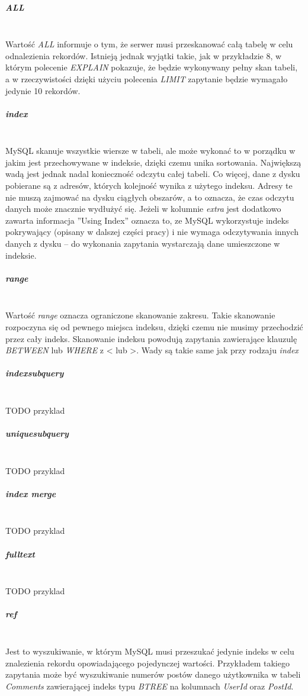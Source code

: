 \subparagraph{ALL}\leavevmode\\
Wartość \textit{ALL} informuje o tym, że serwer musi przeskanować całą tabelę w celu odnalezienia rekordów. Istnieją jednak wyjątki takie, jak w przykładzie 8, w którym polecenie \textit{EXPLAIN} pokazuje, że będzie wykonywany pełny skan tabeli, a w rzeczywistości dzięki użyciu polecenia \textit{LIMIT} zapytanie będzie wymagało jedynie 10 rekordów.

\subparagraph{index}\leavevmode\\
MySQL skanuje wszystkie wiersze w tabeli, ale może wykonać to w porządku w jakim jest przechowywane w indeksie, dzięki czemu unika sortowania. Największą wadą jest jednak nadal konieczność odczytu całej tabeli. Co więcej, dane z dysku pobierane są z adresów, których kolejność wynika z użytego indeksu. Adresy te nie muszą zajmować na dysku ciągłych obszarów, a to oznacza, że czas odczytu danych może znacznie wydłużyć się. Jeżeli w kolumnie \textit{extra} jest dodatkowo zawarta informacja ''Using Index'' oznacza to, ze MySQL wykorzystuje indeks pokrywający (opisany w dalszej części pracy) i nie wymaga odczytywania innych danych z dysku – do wykonania zapytania wystarczają dane umieszczone w indeksie.

\subparagraph{range}\leavevmode\\
Wartość \textit{range} oznacza ograniczone skanowanie zakresu. Takie skanowanie rozpoczyna się od pewnego miejsca indeksu, dzięki czemu nie musimy przechodzić przez cały indeks. Skanowanie indeksu powodują zapytania zawierające klauzulę \textit{BETWEEN} lub \textit{WHERE} z < lub >. Wady są takie same jak przy rodzaju \textit{index}

\subparagraph{index\textunderscore subquery}\leavevmode\\
TODO przyklad
\subparagraph{unique\textunderscore subquery}\leavevmode\\
TODO przyklad
\subparagraph{index merge}\leavevmode\\
TODO przyklad
\subparagraph{fulltext}\leavevmode\\
TODO przyklad

\subparagraph{ref}\leavevmode\\
Jest to wyszukiwanie, w którym MySQL musi przeszukać jedynie indeks w celu znalezienia rekordu opowiadającego pojedynczej wartości.
Przykładem takiego zapytania może być wyszukiwanie numerów postów danego użytkownika w tabeli \textit{Comments} zawierającej indeks typu \textit{BTREE} na kolumnach \textit{UserId} oraz \textit{PostId}.

